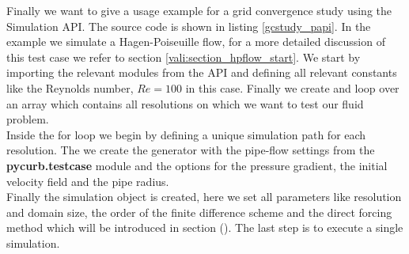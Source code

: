 Finally we want to give a usage example for a grid convergence study using
the Simulation API. The source code is shown in listing \ref{gcstudy_papi}.
In the example we simulate a Hagen-Poiseuille flow, for a more detailed discussion of this test case  we refer to section \ref{vali:section_hpflow_start}.
We start by importing the relevant modules from the API and defining all relevant constants like the
Reynolds number, $Re=100$ in this case.
Finally we create and loop over an  array which contains all resolutions on which we want to test
our fluid problem.\\
Inside the for loop we begin by defining a unique simulation path for each resolution.
The we create the generator with the pipe-flow settings from the \textbf{pycurb.testcase} module and
the options for the pressure gradient, the initial velocity field and the pipe radius.\\
Finally the simulation object is created, here we set all parameters like resolution and domain size,
the order of the finite difference scheme and the direct forcing method which will be introduced in section ().
The last step is to execute a single simulation.\\

\clearpage

